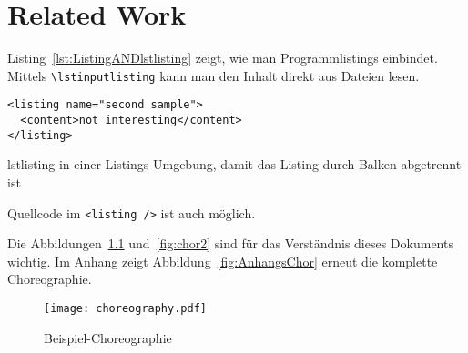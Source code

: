 
\chapter{Related Work}
\label{chap:k2}

Listing~\ref{lst:ListingANDlstlisting} zeigt, wie man Programmlistings einbindet.  Mittels \texttt{\textbackslash lstinputlisting} kann man den Inhalt direkt aus Dateien lesen.

\begin{Listing}
\begin{lstlisting}
<listing name="second sample">
  <content>not interesting</content>
</listing>
\end{lstlisting}
\caption{lstlisting in einer Listings-Umgebung, damit das Listing durch Balken abgetrennt ist}
\label{lst:ListingANDlstlisting}
\end{Listing}

Quellcode im \lstinline|<listing />| ist auch möglich.

Die Abbildungen~\ref{fig:chor1} und~\ref{fig:chor2} sind für das Verständnis dieses Dokuments
wichtig. Im Anhang zeigt Abbildung~\vref{fig:AnhangsChor} erneut die komplette Choreographie.

\begin{figure}
  \begin{center}
    \texttt{[image: choreography.pdf]}
    \caption{Beispiel-Choreographie}
    \label{fig:chor1}
  \end{center}
\end{figure}

